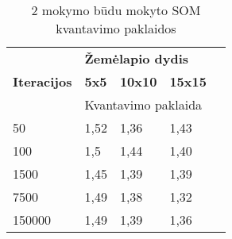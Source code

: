 \documentclass{VUMIFPSbakalaurinis}
\begin{document}
\begin{table}[]
  \centering
  \caption{2 mokymo būdu mokyto SOM kvantavimo paklaidos}{
    \begin{tabular}{|l|lll|l}
      \cline{1-4}
      \multirow{3}{*}{\textbf{Iteracijos}} & \multicolumn{3}{l|}{\textbf{Žemėlapio dydis}}                                            &  \\ \cline{2-4}
                                           & \multicolumn{1}{l|}{\textbf{5x5}} & \multicolumn{1}{l|}{\textbf{10x10}} & \textbf{15x15} &  \\ \cline{2-4}
             & \multicolumn{3}{l|}{Kvantavimo paklaida}                     &  \\ \cline{1-4}
      50     & \multicolumn{1}{l|}{1,52} & \multicolumn{1}{l|}{1,36} & 1,43 &  \\ \cline{1-4}
      100    & \multicolumn{1}{l|}{1,5}  & \multicolumn{1}{l|}{1,44} & 1,40 &  \\ \cline{1-4}
      1500   & \multicolumn{1}{l|}{1,45} & \multicolumn{1}{l|}{1,39} & 1,39 &  \\ \cline{1-4}
      7500   & \multicolumn{1}{l|}{1,49} & \multicolumn{1}{l|}{1,38} & 1,32 &  \\ \cline{1-4}
      150000 & \multicolumn{1}{l|}{1,49} & \multicolumn{1}{l|}{1,39} & 1,36 &  \\ \cline{1-4}
      \end{tabular}}
  \label{tab:q-2}
\end{table}



\begin{table}[]
  \centering
  \caption{1 mokymo būdu mokyto 5x5 dydžio SOM žemėlapis
   po 1000 epochų}{
  }
  \label{tab:5x5-1}
\end{table}
\end{document}
